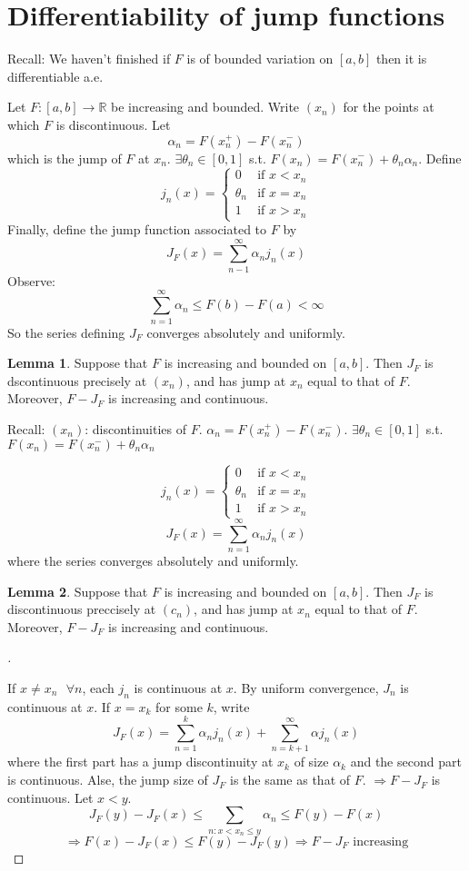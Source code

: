 \documentclass{article}
\theoremstyle{definition}
\newtheorem{lem}{Lemma}
\newenvironment{proofs}[1][\proofname]{%
  \begin{proof}[#1]$ $\par\nobreak\ignorespaces
}{%
  \end{proof}
}
\newcommand{\sfa}{\text{  } \forall}
\begin{document}
\section{Differentiability of jump functions}

Recall: We haven't finished if $F$ is of bounded variation on $[a, b]$ then it is differentiable a.e.
\par Let $F:[a, b] \to \mathbb{R}$ be increasing and bounded. Write $(x_n)$ for the points at which $F$ is discontinuous. Let
\[
  \alpha_n = F(x_n^+) - F(x_n^-)
\]
which is the jump of $F$ at $x_n$. $\exists \theta_n \in [0,1]$ s.t. $F(x_n) = F(x_n^-) + \theta_n \alpha_n$. Define 
\[
  j_n(x) = 
  \begin{cases}
    0 & \text{if } x < x_n\\
    \theta_n & \text{if } x = x_n\\
    1 & \text{if } x > x_n
  \end{cases}
\]
Finally, define the jump function associated to $F$ by 
\[
  J_F(x) = \sum_{n - 1}^\infty \alpha_n j_n(x)
\]
Observe:
\[
  \sum_{n = 1}^\infty \alpha_n \leq F(b) - F(a) < \infty
\]
So the series defining $J_F$ converges absolutely and uniformly. 
\begin{lem}
  Suppose that $F$ is increasing and bounded on $[a, b]$. Then $J_F$ is dscontinuous precisely at $(x_n)$, and has jump at $x_n$ equal to that of $F$. Moreover, $F - J_F$ is increasing and continuous. 
\end{lem}

\par Recall: $(x_n)$: discontinuities of $F$. $\alpha_n = F(x_n^+) - F(x_n^-)$. $\exists \theta_n \in [0, 1]$ s.t. $F(x_n) = F(x_n^-) + \theta_n \alpha_n$

\[
  j_n(x) = 
  \begin{cases}
    0 & \text{if } x < x_n\\
    \theta_n & \text{if } x = x_n\\
    1 & \text{if } x > x_n
  \end{cases}
\]
\[
  J_F(x) = \sum_{n = 1}^\infty \alpha_n j_n(x) 
\]
where the series converges absolutely and uniformly.

\begin{lem}
  Suppose that $F$ is increasing and bounded on $[a, b]$. Then $J_F$ is discontinuous preccisely at $(c_n)$, and has jump at $x_n$ equal to that of $F$. Moreover, $F - J_F$ is increasing and continuous. 
\end{lem}

\begin{proofs}
  If $x \neq x_n \sfa n$, each $j_n$ is continuous at $x$. By uniform convergence, $J_n$ is continuous at $x$. If $x = x_k$ for some $k$, write 
  \[
    J_F(x) = \sum_{n = 1}^k \alpha_n j_n(x) + \sum_{n = k + 1}^{\infty} \alpha j_n(x)
  \]
  where the first part has a jump discontinuity at $x_k$ of size $\alpha_k$ and the second part is continuous. Alse, the jump size of $J_F$ is the same as that of $F$. $\Rightarrow F - J_F$ is continuous. Let $x < y$. 
  \[
    J_F(y) - J_F(x) \leq \sum_{n: x < x_n \leq y} \alpha_n \leq F(y) - F(x)
  \]
  \[
    \Rightarrow F(x) - J_F(x) \leq F(y) - J_F(y) \Rightarrow F - J_F \text{ increasing}
  \]
\end{proofs}
\end{document}
